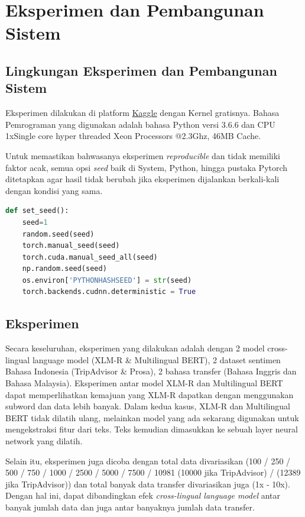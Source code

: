\chapter{Eksperimen dan Pembangunan Sistem}

\section{Lingkungan Eksperimen dan Pembangunan Sistem}

Eksperimen dilakukan di platform \href{https://www.kaggle.com}{Kaggle} dengan Kernel gratisnya. Bahasa Pemrograman yang digunakan adalah bahasa Python versi 3.6.6 dan CPU 1xSingle core hyper threaded Xeon Processors @2.3Ghz, 46MB Cache.

Untuk memastikan bahwasanya eksperimen \textit{reproducible} dan tidak memiliki faktor acak, semua opsi \textit{seed} baik di System, Python, hingga pustaka Pytorch ditetapkan agar hasil tidak berubah jika eksperimen dijalankan berkali-kali dengan kondisi yang sama.

\begin{lstlisting}[language=Python]
def set_seed():
    seed=1
    random.seed(seed)
    torch.manual_seed(seed)
    torch.cuda.manual_seed_all(seed)
    np.random.seed(seed)
    os.environ['PYTHONHASHSEED'] = str(seed)
    torch.backends.cudnn.deterministic = True
\end{lstlisting}



\section{Eksperimen}
Secara keseluruhan, eksperimen yang dilakukan adalah dengan 2 model cross-lingual language model (XLM-R \& Multilingual BERT), 2 dataset sentimen Bahasa Indonesia (TripAdvisor \& Prosa), 2 bahasa transfer (Bahasa Inggris dan Bahasa Malaysia). Eksperimen antar model XLM-R dan Multilingual BERT dapat memperlihatkan kemajuan yang XLM-R dapatkan dengan menggunakan subword dan data lebih banyak. Dalam kedua kasus, XLM-R dan Multilingual BERT tidak dilatih ulang, melainkan model yang ada sekarang digunakan untuk mengekstraksi fitur dari teks. Teks kemudian dimasukkan ke sebuah layer neural network yang dilatih.

Selain itu, eksperimen juga dicoba dengan total data divariasikan (100 / 250 / 500 / 750 / 1000 / 2500 / 5000 / 7500 / 10981 (10000 jika TripAdvisor) / (12389 jika TripAdvisor)) dan total banyak data transfer divariasikan juga (1x - 10x). Dengan hal ini, dapat dibandingkan efek \textit{cross-lingual language model} antar banyak jumlah data dan juga antar banyaknya jumlah data transfer.


